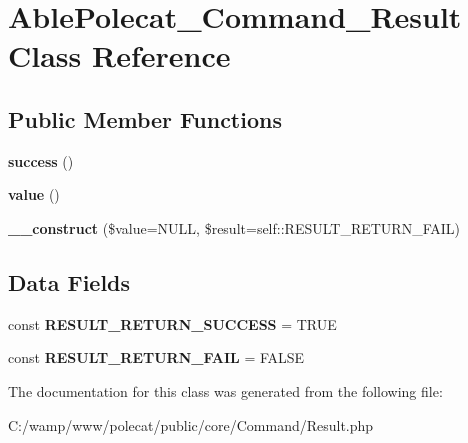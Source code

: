 \hypertarget{class_able_polecat___command___result}{}\section{Able\+Polecat\+\_\+\+Command\+\_\+\+Result Class Reference}
\label{class_able_polecat___command___result}
\subsection*{Public Member Functions}
\begin{DoxyCompactItemize}
\item 
\hypertarget{class_able_polecat___command___result_ae3aaa78a09e613892295d90324f6a4c0}{}{\bfseries success} ()\label{class_able_polecat___command___result_ae3aaa78a09e613892295d90324f6a4c0}

\item 
\hypertarget{class_able_polecat___command___result_aefbfa229f1c9e1fc967bff724a010f9e}{}{\bfseries value} ()\label{class_able_polecat___command___result_aefbfa229f1c9e1fc967bff724a010f9e}

\item 
\hypertarget{class_able_polecat___command___result_ab1eb7374f5ba22aea5bfafe4ea236301}{}{\bfseries \+\_\+\+\_\+construct} (\$value=N\+U\+L\+L, \$result=self\+::\+R\+E\+S\+U\+L\+T\+\_\+\+R\+E\+T\+U\+R\+N\+\_\+\+F\+A\+I\+L)\label{class_able_polecat___command___result_ab1eb7374f5ba22aea5bfafe4ea236301}

\end{DoxyCompactItemize}
\subsection*{Data Fields}
\begin{DoxyCompactItemize}
\item 
\hypertarget{class_able_polecat___command___result_a344660c3178da3b30835095b04aae7a2}{}const {\bfseries R\+E\+S\+U\+L\+T\+\_\+\+R\+E\+T\+U\+R\+N\+\_\+\+S\+U\+C\+C\+E\+S\+S} = T\+R\+U\+E\label{class_able_polecat___command___result_a344660c3178da3b30835095b04aae7a2}

\item 
\hypertarget{class_able_polecat___command___result_a1735eba029860bd4f29a389bf1ef6559}{}const {\bfseries R\+E\+S\+U\+L\+T\+\_\+\+R\+E\+T\+U\+R\+N\+\_\+\+F\+A\+I\+L} = F\+A\+L\+S\+E\label{class_able_polecat___command___result_a1735eba029860bd4f29a389bf1ef6559}

\end{DoxyCompactItemize}


The documentation for this class was generated from the following file\+:\begin{DoxyCompactItemize}
\item 
C\+:/wamp/www/polecat/public/core/\+Command/Result.\+php\end{DoxyCompactItemize}
